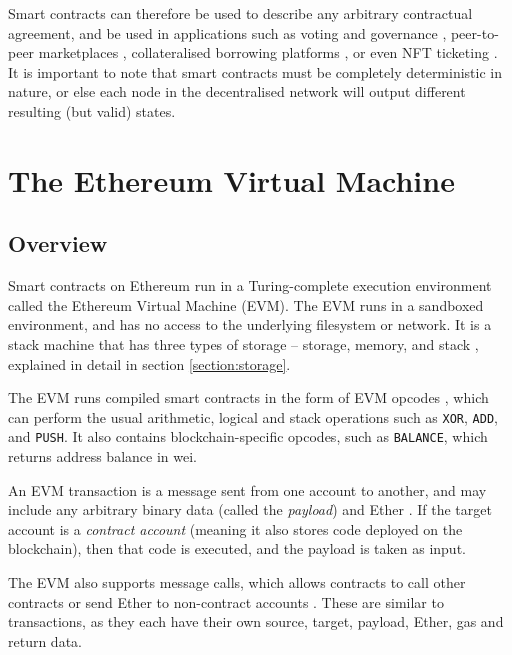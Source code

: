 Smart contracts can therefore be used to describe any arbitrary contractual agreement,
and be used in applications such as voting and governance \cite{ethdao}, 
peer-to-peer marketplaces \cite{opensea}, 
collateralised borrowing platforms \cite{aave} \cite{compound}, or even NFT ticketing \cite{getprotocol} \cite{tkets}.
It is important to note that smart contracts must be completely deterministic in nature, 
or else each node in the decentralised network will output different resulting (but valid) states.

\section{The Ethereum Virtual Machine}

\subsection{Overview}

Smart contracts on Ethereum run in a Turing-complete execution environment called the
Ethereum Virtual Machine (EVM). The EVM runs in a sandboxed environment, and has no access
to the underlying filesystem or network. It is a stack machine that has three types of
storage -- storage, memory, and stack \cite{ethevm}, explained in detail in section \ref{section:storage}.

The EVM runs compiled smart contracts in the form of EVM opcodes \cite{solidityevm}, which can perform
the usual arithmetic, logical and stack operations such as \texttt{XOR}, \texttt{ADD}, and 
\texttt{PUSH}. It also contains blockchain-specific opcodes, such as \texttt{BALANCE}, 
which returns address balance in wei.

An EVM transaction is a message sent from one account to another, and may include any
arbitrary binary data (called the \textit{payload}) and Ether \cite{solidityevm}. If the
target account is a \textit{contract account} (meaning it also stores code deployed on
the blockchain), then that code is executed, and the payload is taken as input.

The EVM also supports message calls, which allows contracts to call other contracts or
send Ether to non-contract accounts \cite{solidityevm}. These are similar to transactions, 
as they each have their own source, target, payload, Ether, gas and return data.


